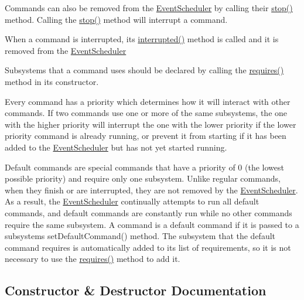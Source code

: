 Commands can also be removed from the \mbox{\hyperlink{classlib_iterative_robot_1_1_event_scheduler}{Event\+Scheduler}} by calling their \mbox{\hyperlink{classlib_iterative_robot_1_1_command_ac91308101424f447f80665244b554171}{stop()}} method. Calling the \mbox{\hyperlink{classlib_iterative_robot_1_1_command_ac91308101424f447f80665244b554171}{stop()}} method will interrupt a command.

When a command is interrupted, its \mbox{\hyperlink{classlib_iterative_robot_1_1_command_a1c17b601d1b69822cabadb92069d1747}{interrupted()}} method is called and it is removed from the \mbox{\hyperlink{classlib_iterative_robot_1_1_event_scheduler}{Event\+Scheduler}}

Subsystems that a command uses should be declared by calling the \mbox{\hyperlink{classlib_iterative_robot_1_1_command_ad7b7f328974f5f17a2a4b1593b6c9eb5}{requires()}} method in its constructor.

Every command has a priority which determines how it will interact with other commands. If two commands use one or more of the same subsystems, the one with the higher priority will interrupt the one with the lower priority if the lower priority command is already running, or prevent it from starting if it has been added to the \mbox{\hyperlink{classlib_iterative_robot_1_1_event_scheduler}{Event\+Scheduler}} but has not yet started running.

Default commands are special commands that have a priority of 0 (the lowest possible priority) and require only one subsystem. Unlike regular commands, when they finish or are interrupted, they are not removed by the \mbox{\hyperlink{classlib_iterative_robot_1_1_event_scheduler}{Event\+Scheduler}}. As a result, the \mbox{\hyperlink{classlib_iterative_robot_1_1_event_scheduler}{Event\+Scheduler}} continually attempts to run all default commands, and default commands are constantly run while no other commands require the same subsystem. A command is a default command if it is passed to a subsystem\textquotesingle{}s set\+Default\+Command() method. The subsystem that the default command requires is automatically added to its list of requirements, so it is not necessary to use the \mbox{\hyperlink{classlib_iterative_robot_1_1_command_ad7b7f328974f5f17a2a4b1593b6c9eb5}{requires()}} method to add it. 

\subsection{Constructor \& Destructor Documentation}
\mbox{\label{classlib_iterative_robot_1_1_command_a18df2d81039392daeb0b78c346a70537}} 
